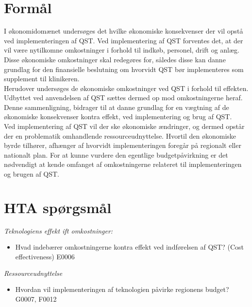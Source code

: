 
\section{Formål}
I økonomidomænet undersøges det hvilke økonomiske konsekvenser der vil opstå ved implementeringen af QST. Ved implementering af QST forventes det, at der vil være nytilkomne omkostninger i forhold til indkøb, personel, drift og anlæg. Disse økonomiske omkostninger skal redegøres for, således disse kan danne grundlag for den finansielle beslutning om hvorvidt QST bør implementeres som supplement til klinikeren. \\
Herudover undersøges de økonomiske omkostninger ved QST i forhold til effekten. Udbyttet ved anvendelsen af QST sættes dermed op mod omkostningerne heraf. Denne sammenligning, bidrager til at danne grundlag for en vægtning af de økonomiske konsekvenser kontra effekt, ved implementering og brug af QST. \\ 
Ved implementering af  QST vil der ske økonomiske ændringer, og dermed opstår der en problematik omhandlende ressourceudnyttelse. Hvortil den økonomiske byrde tilhører, afhænger af hvorvidt implementeringen foregår på regionalt eller nationalt plan. For at kunne vurdere den egentlige budgetpåvirkning er det nødvendigt at kende omfanget af  omkostningerne relateret til implementeringen og brugen af QST. 
\section{HTA spørgsmål}
\textit{Teknologiens effekt ift omkostninger:}
\begin{itemize}
	\item Hvad indebærer omkostningerne kontra effekt ved indførelsen af QST? (Cost effectiveness) E0006 
\end{itemize}

\textit{Ressourceudnyttelse}
\begin{itemize}
	\item Hvordan vil implementeringen af teknologien påvirke regionens budget? G0007, F0012
\end{itemize}
